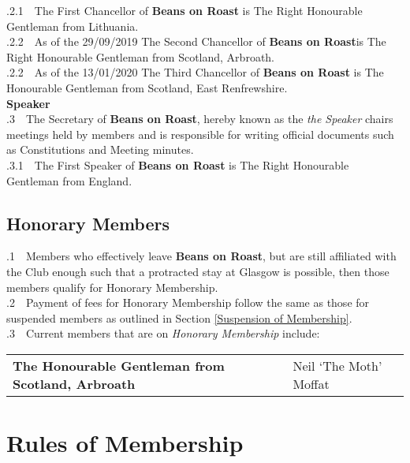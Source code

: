\documentclass[a4paper,11pt]{article}
\begin{document}
.2.1$\quad$The First Chancellor of \textbf{Beans on Roast} is The Right Honourable Gentleman from Lithuania.\\
.2.2$\quad$As of the 29/09/2019 The Second Chancellor of \textbf{Beans on Roast}is The Right Honourable Gentleman from Scotland, Arbroath.\\
.2.2$\quad$As of the 13/01/2020 The Third Chancellor of \textbf{Beans on Roast} is The Honourable Gentleman from Scotland, East Renfrewshire.\\


\textbf{Speaker}\\

.3$\quad$The Secretary of \textbf{Beans on Roast}, hereby known as the \textit{the Speaker} chairs meetings held by members and is responsible for writing official documents such as Constitutions and Meeting minutes.\\ 

.3.1$\quad$The First Speaker of \textbf{Beans on Roast} is The Right Honourable Gentleman from England.\\
\subsection{Honorary Members}
\label{Honorary Members??}
.1$\quad$Members who effectively leave \textbf{Beans on Roast}, but are still affiliated with the Club enough such that a protracted stay at Glasgow is possible, then those members qualify for Honorary Membership.\\

.2$\quad$Payment of fees for Honorary Membership follow the same as those for suspended members as outlined in Section \ref{Suspension of Membership}.\\

.3$\quad$Current members that are on \textit{Honorary Membership} include:
\begin{table}[h!]
\begin{tabular}{ll}
\textbf{The Honourable Gentleman from  Scotland, Arbroath} & Neil `The Moth' Moffat \\
\end{tabular}
\end{table}

\section{Rules of Membership}
\label{Rules of Membership}
\end{document}
